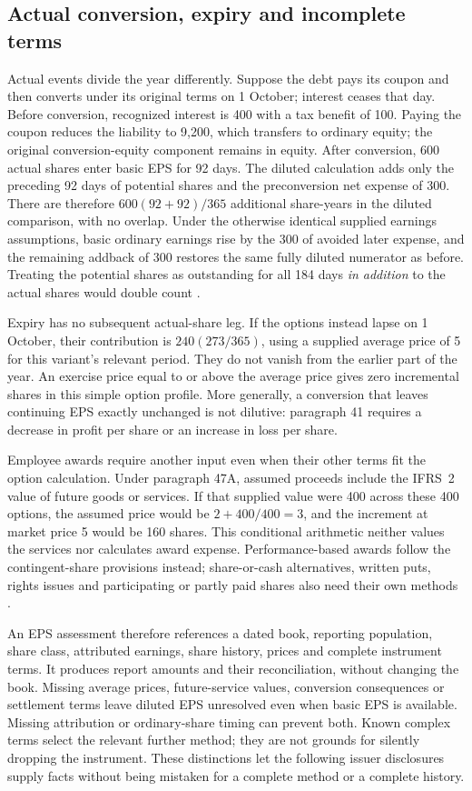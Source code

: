 \subsection{Actual conversion, expiry and incomplete terms}

Actual events divide the year differently. Suppose the debt pays its coupon
and then converts under its original terms on 1 October; interest ceases
that day. Before conversion, recognized interest is 400 with a tax benefit
of 100. Paying the coupon reduces the liability to 9,200, which transfers
to ordinary equity; the original conversion-equity component remains in equity.
After conversion, 600 actual shares enter basic EPS for 92 days.
The diluted calculation adds only the preceding 92 days of potential
shares and the preconversion net expense of 300. There are therefore
$600(92+92)/365$ additional share-years in the diluted comparison, with
no overlap. Under the otherwise identical supplied earnings assumptions,
basic ordinary earnings rise by the 300 of avoided later expense, and
the remaining addback of 300 restores the same fully diluted numerator
as before. Treating the potential shares as outstanding for all 184 days
\emph{in addition} to the actual shares would double count
\citep[IAS~33, paragraphs 21(c), 36--38]{eu20231803}.

Expiry has no subsequent actual-share leg. If the options instead lapse
on 1 October, their contribution is $240(273/365)$, using a supplied
average price of 5 for this variant's relevant period. They do not vanish
from the earlier part of the year. An exercise price equal to or above
the average price gives zero incremental shares in this simple option
profile. More generally, a conversion that leaves continuing EPS exactly
unchanged is not dilutive: paragraph 41 requires a decrease in profit
per share or an increase in loss per share.

Employee awards require another input even when their other terms fit
the option calculation. Under paragraph 47A, assumed proceeds include
the IFRS~2 value of future goods or services. If that supplied value were
400 across these 400 options, the assumed price would be
$2+400/400=3$, and the increment at market price 5 would be 160 shares.
This conditional arithmetic neither values the services nor calculates
award expense. Performance-based awards follow the contingent-share
provisions instead; share-or-cash alternatives, written puts, rights
issues and participating or partly paid shares also need their own
methods \citep[IAS~33, paragraphs 47A--63, A2 and A13--A16]{eu20231803}.

An EPS assessment therefore references a dated book, reporting population,
share class, attributed earnings, share history, prices and complete
instrument terms. It produces report amounts and their reconciliation,
without changing the book. Missing average prices, future-service values,
conversion consequences or settlement terms leave diluted EPS unresolved
even when basic EPS is available. Missing attribution or ordinary-share
timing can prevent both. Known complex terms select the relevant further
method; they are not grounds for silently dropping the instrument.
These distinctions let the following issuer disclosures supply facts
without being mistaken for a complete method or a complete history.
